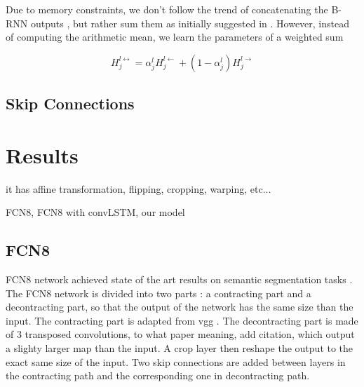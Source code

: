 Due to memory constraints, we don't follow the trend of concatenating the B-RNN
outputs \cite{}, but rather sum them as initially suggested in
\cite{Schuster1997bidirecrnn}. However, instead of computing the arithmetic
mean, we learn the parameters of a weighted sum

\[ H_j^{l\leftrightarrow} = \alpha_j^{l} H_j^{l\leftarrow} + (1 - \alpha_j^{l}) H_j^{l\rightarrow}\]

\subsection{Skip Connections}


\section{Results}\label{sec:deconvLSTM_results}

it has affine transformation, flipping, cropping, warping, etc...


FCN8, FCN8 with convLSTM, our model
\subsection{FCN8}
FCN8 network achieved state of the art results on semantic segmentation tasks
\cite{DBLP:conf/cvpr/LongSD15}. The FCN8 network is divided into two parts : a
contracting part and a decontracting part, so that the output of the network
has the same size than the input. The contracting part is adapted from vgg
\cite{Simonyan14vgg}. The decontracting part is made of 3 transposed
convolutions, to what paper meaning, add citation, which output a slighty
larger map than the input. A crop layer then reshape the output to the exact
same size of the input. Two skip connections are added between layers in the
contracting path and the corresponding one in decontracting path.

